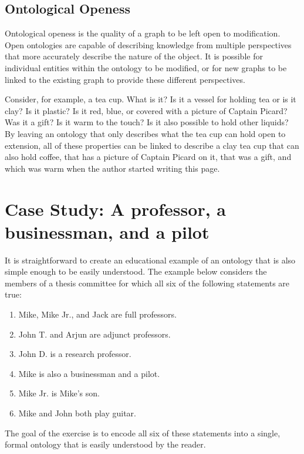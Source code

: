 \subsection{Ontological Openess}
\label{ont-openess}

Ontological openess is the quality of a graph to be left open to modification.
Open ontologies are capable of describing knowledge from multiple perspectives
that more accurately describe the nature of the object. It is possible for
individual entities within the ontology to be modified, or for new graphs to be
linked to the existing graph to provide these different perspectives.

Consider, for example, a tea cup. What is it? Is it a vessel for holding tea or
is it clay? Is it plastic? Is it red, blue, or covered with a picture of
Captain Picard? Was it a gift? Is it warm to the touch? Is it also possible to
hold other liquids? By leaving an ontology that only describes what the tea cup
can hold open to extension, all of these properties can be linked to describe a
clay tea cup that can also hold coffee, that has a picture of Captain Picard on
it, that was a gift, and which was warm when the author started writing this
page.

\section{Case Study: A professor, a businessman, and a pilot}
\label{case-study}

It is straightforward to create an educational example of an ontology that is
also simple enough to be easily understood. The example below considers the
members of a thesis committee for which all six of the following statements are
true:

\begin{enumerate}
\item Mike, Mike Jr., and Jack are full professors. %
\item John T. and Arjun are adjunct professors.     %
\item John D. is a research professor.              %
\item Mike is also a businessman and a pilot.       %
\item Mike Jr. is Mike's son.                       %
\item Mike and John both play guitar.               %
\end{enumerate}

The goal of the exercise is to encode all six of these statements into a single,
formal ontology that is easily understood by the reader.


